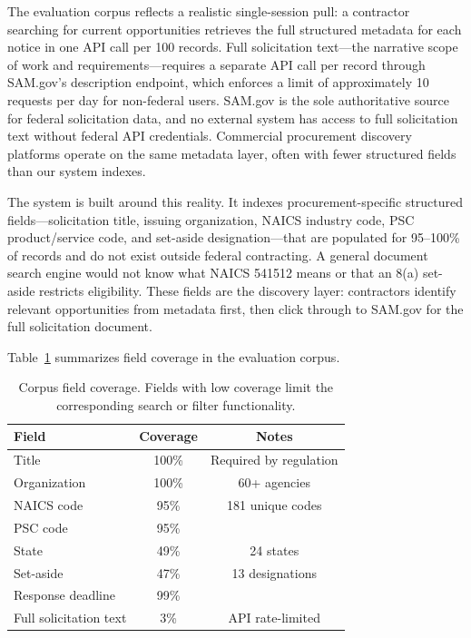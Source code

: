 \documentclass[10pt,twocolumn]{article}
\begin{document}
The evaluation corpus reflects a realistic single-session pull: a contractor searching for current opportunities retrieves the full structured metadata for each notice in one API call per 100 records. Full solicitation text---the narrative scope of work and requirements---requires a separate API call per record through SAM.gov's description endpoint, which enforces a limit of approximately 10 requests per day for non-federal users. SAM.gov is the sole authoritative source for federal solicitation data, and no external system has access to full solicitation text without federal API credentials. Commercial procurement discovery platforms operate on the same metadata layer, often with fewer structured fields than our system indexes.

The system is built around this reality. It indexes procurement-specific structured fields---solicitation title, issuing organization, NAICS industry code, PSC product/service code, and set-aside designation---that are populated for 95--100\% of records and do not exist outside federal contracting. A general document search engine would not know what NAICS 541512 means or that an 8(a) set-aside restricts eligibility. These fields are the discovery layer: contractors identify relevant opportunities from metadata first, then click through to SAM.gov for the full solicitation document.

Table~\ref{tab:data-quality} summarizes field coverage in the evaluation corpus.

\begin{table}[h]
\centering
\small
\caption{Corpus field coverage. Fields with low coverage limit the corresponding search or filter functionality.}
\begin{tabular}{lcc}
\toprule
Field & Coverage & Notes \\
\midrule
Title & 100\% & Required by regulation \\
Organization & 100\% & 60+ agencies \\
NAICS code & 95\% & 181 unique codes \\
PSC code & 95\% & \\
State & 49\% & 24 states \\
Set-aside & 47\% & 13 designations \\
Response deadline & 99\% & \\
Full solicitation text & 3\% & API rate-limited \\
\bottomrule
\end{tabular}
\label{tab:data-quality}
\end{table}
\end{document}
